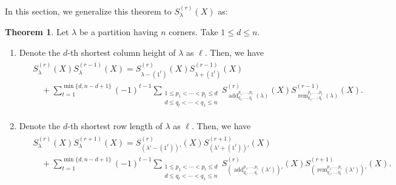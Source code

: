 \documentclass[12pt]{amsart}%
\theoremstyle{definition}
\newtheorem{theorem}{Theorem}[section]
\DeclareMathOperator{\add}{add}
\DeclareMathOperator{\rem}{rem}
\begin{document}
In this section, 
we generalize this theorem to $S^{(r)}_{\lambda}(X)$ as: 
 
\begin{theorem}
\label{thm:9thPlucker}
Let $\lambda$ be a partition having $n$ corners.
Take $1\le d\le n$. 
\begin{enumerate}
\item  
Denote the $d$-th shortest column height of $\lambda$ as $\ell$.
Then, we have  
\begin{align}
\label{for:9thPlucker}
\begin{split}
&S_{\lambda}^{(r)}(X)S_{\lambda}^{(r-1)}(X)
=S_{\lambda-(1^{\ell})}^{(r)}(X)
S_{\lambda+(1^{\ell})}^{(r-1)}(X)
\\
&\quad +\sum^{\min\{d,n-d+1\}}_{t=1}(-1)^{t-1}
\sum_{\substack{1\le p_1<\cdots<p_t\le d \\ d\le q_t<\cdots<q_1\le n}}
S_{\add^{p_1,\ldots,p_t}_{q_1,\ldots,q_t}(\lambda)}^{(r)}(X)
S_{\rem^{p_1,\ldots,p_t}_{q_1,\ldots,q_t}(\lambda)}^{(r-1)}(X).
\end{split}
\end{align}
\item 
Denote the $d$-th shortest row length of $\lambda$ as $\ell$.
Then, we have  
\begin{align}
\label{for:9thDualPlucker}
\begin{split}
&S_{\lambda}^{(r)}(X)S_{\lambda}^{(r+1)}(X)
=S_{(\lambda'-(1^{\ell}))'}^{(r)}(X)
S_{(\lambda'+(1^{\ell}))'}^{(r+1)}(X)\\
&\quad +\sum^{\min\{d,n-d+1\}}_{t=1}(-1)^{t-1}
\sum_{\substack{1\le p_1<\cdots<p_t\le d \\ d\le q_t<\cdots<q_1\le n}}
S_{(\add^{p_1,\ldots,p_t}_{q_1,\ldots,q_t}(\lambda'))'}^{(r)}(X)
S_{(\rem^{p_1,\ldots,p_t}_{q_1,\ldots,q_t}(\lambda'))'}^{(r+1)}(X).
\end{split}
\end{align}
\end{enumerate}
\end{theorem}
\end{document}
